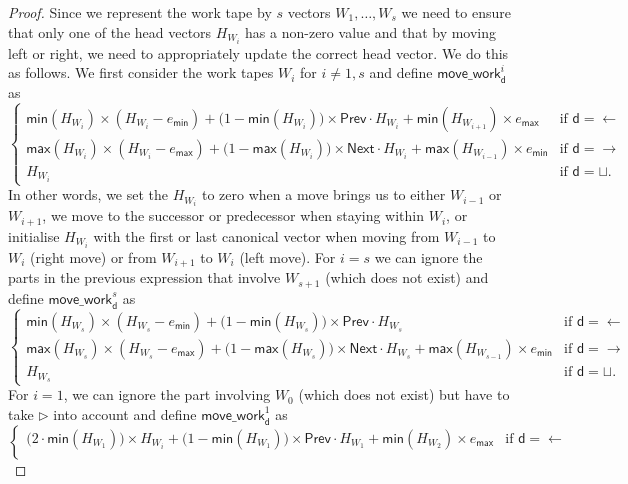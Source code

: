 \begin{proof}
    Since we represent the work tape by $s$ vectors $W_1,\ldots,W_s$ we need to ensure that only one 
    of the head vectors $H_{W_i}$ has a non-zero value and that by moving left or right, we need to 
    appropriately update the correct head vector. We do this as follows. We first consider the work tapes 
    $W_i$ for $i\neq 1,s$ and define $    \mathsf{move\_work}^i_{\mathsf{d}}$ as
    $$
    \begin{cases}
        \mathsf{min}(H_{W_i})\times (H_{W_i}-e_{\mathsf{min}}) + \bigl(1-\mathsf{min}(H_{W_i})\bigr)\times \mathsf{Prev}\cdot H_{W_i} 
		+ \mathsf{min}(H_{W_{i+1}})\times e_{\mathsf{max}} & \text{if $\mathsf{d}=\leftarrow$}\\
            \mathsf{max}(H_{W_i})\times (H_{W_i}-e_{\mathsf{max}}) + \bigl(1-\mathsf{max}(H_{W_i})\bigr)\times \mathsf{Next}\cdot H_{W_i}
			+ \mathsf{max}(H_{W_{i-1}})\times e_{\mathsf{min}} & \text{if $\mathsf{d}=\rightarrow$}\\
        H_{W_i} & \text{if $\mathsf{d}=\sqcup$}. 	
    \end{cases}
    $$
    In other words, we set the $H_{W_i}$ to zero when a move brings us to either $W_{i-1}$ or $W_{i+1}$, we
    move to the  successor or predecessor when staying within $W_i$, or initialise $H_{W_i}$ with the first or 
    last canonical vector when moving from $W_{i-1}$ to $W_i$ (right move) or from $W_{i+1}$ to $W_i$ (left move).
    For $i=s$ we can ignore the parts in the previous expression that involve $W_{s+1}$ (which does not exist)
	and define $\mathsf{move\_work}^s_{\mathsf{d}}$ as
    $$
     \begin{cases}
        \mathsf{min}(H_{W_s})\times (H_{W_s}-e_{\mathsf{min}}) + \bigl(1-\mathsf{min}(H_{W_s})\bigr)\times \mathsf{Prev}\cdot H_{W_s} & \text{if $\mathsf{d}=\leftarrow$}\\
            \mathsf{max}(H_{W_s}) \times (H_{W_s}-e_{\mathsf{max}})  + \bigl(1-\mathsf{max}(H_{W_s})\bigr)\times \mathsf{Next}\cdot H_{W_s}
		+ \mathsf{max}(H_{W_{s-1}})\times e_{\mathsf{min}} & \text{if $\mathsf{d}=\rightarrow$}\\
        H_{W_s} & \text{if $\mathsf{d}=\sqcup$}. 	
    \end{cases}
    $$
    For $i=1$, we can ignore the part involving $W_{0}$ (which does not exist) but have to take $\rhd$ 
    into account and define $  \mathsf{move\_work}^1_{\mathsf{d}}$ as
    $$
      \begin{cases}
        \bigl(2\cdot \mathsf{min}(H_{W_1})\bigr)\times H_{W_i} + \bigl(1-\mathsf{min}(H_{W_1})\bigr)\times \mathsf{Prev}\cdot H_{W_1} + \mathsf{min}(H_{W_{2}})\times e_{\mathsf{max}} & \text{if $\mathsf{d}=\leftarrow$}\\

\end{cases}$$
\end{proof}
